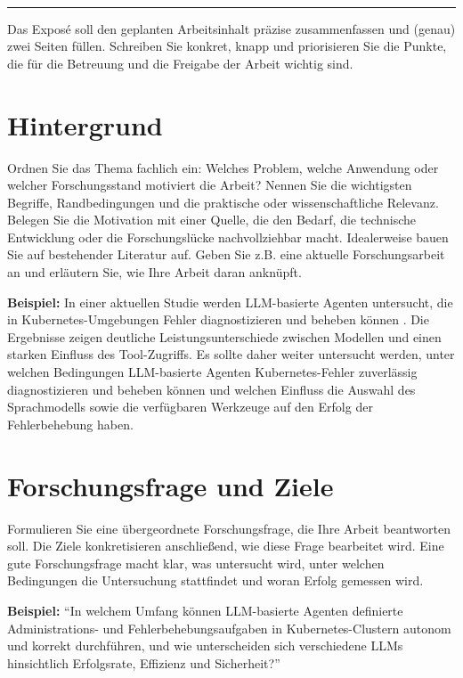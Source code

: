 \documentclass[a4paper, 11pt]{scrartcl}
\title{\thema}
\author{\name \hspace{.5em} (\matnr) \\ \texttt{\email} \\ \studiengang}
\date{}
\makeatletter
\renewcommand{\maketitle}{\bgroup\setlength{\parindent}{0pt}
\begin{flushleft}
  {\Large\sffamily \textbf{\@title}}\\[.4em]
  {\large\sffamily \@author}
  \noindent
  \color{fhblue}\rule{\textwidth}{1mm}\color{black}
  \vspace*{.2em}
\end{flushleft}\egroup
}
\makeatother
\begin{document}
\maketitle
\thispagestyle{empty}

Das Exposé soll den geplanten Arbeitsinhalt präzise zusammenfassen und (genau) zwei Seiten füllen. Schreiben Sie konkret, knapp und priorisieren Sie die Punkte, die für die Betreuung und die Freigabe der Arbeit wichtig sind.

\section*{Hintergrund}
Ordnen Sie das Thema fachlich ein: Welches Problem, welche Anwendung oder welcher Forschungsstand motiviert die Arbeit? Nennen Sie die wichtigsten Begriffe, Randbedingungen und die praktische oder wissenschaftliche Relevanz. Belegen Sie die Motivation mit einer Quelle, die den Bedarf, die technische Entwicklung oder die Forschungslücke nachvollziehbar macht.
Idealerweise bauen Sie auf bestehender Literatur auf. Geben Sie z.B. eine aktuelle Forschungsarbeit an und erläutern Sie, wie Ihre Arbeit daran anknüpft.

\textbf{Beispiel:} In einer aktuellen Studie werden LLM-basierte Agenten untersucht, die in Kubernetes-Umgebungen Fehler diagnostizieren und beheben können \cite{operaid2026}. Die Ergebnisse zeigen deutliche Leistungsunterschiede zwischen Modellen und einen starken Einfluss des Tool-Zugriffs. Es sollte daher weiter untersucht werden, unter welchen Bedingungen LLM-basierte Agenten Kubernetes-Fehler zuverlässig diagnostizieren und beheben können und welchen Einfluss die Auswahl des Sprachmodells sowie die verfügbaren Werkzeuge auf den Erfolg der Fehlerbehebung haben.


\section*{Forschungsfrage und Ziele}
Formulieren Sie eine übergeordnete Forschungsfrage, die Ihre Arbeit beantworten soll. Die Ziele konkretisieren anschließend, wie diese Frage bearbeitet wird. Eine gute Forschungsfrage macht klar, was untersucht wird, unter welchen Bedingungen die Untersuchung stattfindet und woran Erfolg gemessen wird.

\textbf{Beispiel:} \enquote{In welchem Umfang können LLM-basierte Agenten definierte Administrations- und Fehlerbehebungsaufgaben in Kubernetes-Clustern autonom und korrekt durchführen, und wie unterscheiden sich verschiedene LLMs hinsichtlich Erfolgsrate, Effizienz und Sicherheit?}
\end{document}

